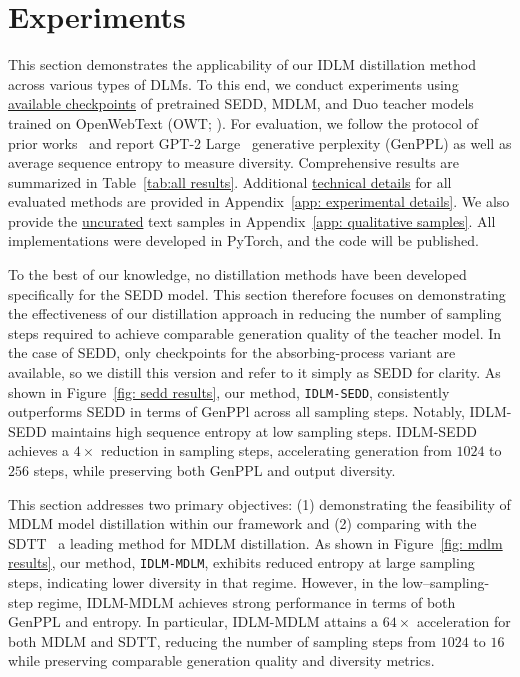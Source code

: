 \vspace{-2mm}
\section{Experiments}
\label{sec:exps}
\vspace{-2mm}
  This section demonstrates the applicability of our IDLM distillation method across various types of DLMs. To this end,
  we conduct experiments using \underline{available checkpoints} of pretrained SEDD, MDLM, and Duo teacher models trained
on OpenWebText (OWT; \citealp{gokaslan2019openwebtext}). For evaluation, we follow the protocol of prior
works~\citep{dieleman2022continuous, lou2024discrete, deschenaux2024beyond, sahoo2024simple, sahoo2025the}
and report GPT-2 Large~\citep{radford2019language} generative perplexity (GenPPL) as well as average sequence entropy to
measure diversity. Comprehensive results are summarized in Table~\ref{tab:all results}. Additional
\underline{technical details} for all evaluated methods are provided in Appendix~\ref{app: experimental details}.
We also provide the \underline{uncurated} text samples in Appendix~\ref{app: qualitative samples}.
All implementations were developed in PyTorch, and the code will be published.


  To the best of our knowledge, no distillation methods have been developed specifically for the SEDD model.
  This section therefore focuses on demonstrating the effectiveness of our distillation approach in reducing the number
  of sampling steps required to achieve comparable generation quality of the teacher model. In the case of SEDD, only
  checkpoints for the absorbing-process variant are available, so we distill this version and refer to it simply as SEDD
  for clarity.
  As shown in Figure~\ref{fig: sedd results}, our method, \texttt{IDLM-SEDD}, consistently outperforms SEDD in terms of
GenPPl across all sampling steps. Notably, IDLM-SEDD maintains high sequence entropy at low sampling steps. IDLM-SEDD
achieves a $4\times$ reduction in sampling steps, accelerating generation from $1024$ to $256$ steps, while preserving
both GenPPL and output diversity.

  This section addresses two primary objectives: (1) demonstrating the feasibility of MDLM model distillation within our
  framework and (2) comparing with the SDTT~\citep{deschenaux2024beyond} a leading method for MDLM distillation.
As shown in Figure~\ref{fig: mdlm results}, our method, \texttt{IDLM-MDLM}, exhibits reduced entropy at large sampling steps, indicating lower diversity in that regime. However, in the low–sampling-step regime, IDLM-MDLM achieves strong performance in terms of both GenPPL and entropy. In particular, IDLM-MDLM attains a $64\times$ acceleration for both MDLM and SDTT, reducing the number of sampling steps from $1024$ to $16$ while preserving comparable generation quality and diversity metrics.

